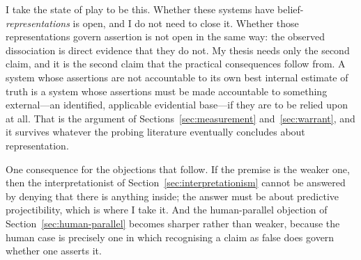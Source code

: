 I take the state of play to be this. Whether these systems have
belief-\emph{representations} is open, and I do not need to close it. Whether
those representations govern assertion is not open in the same way: the observed
dissociation is direct evidence that they do not. My thesis needs only the second
claim, and it is the second claim that the practical consequences follow from. A
system whose assertions are not accountable to its own best internal estimate of
truth is a system whose assertions must be made accountable to something
external---an identified, applicable evidential base---if they are to be relied
upon at all. That is the argument of
Sections~\ref{sec:measurement} and~\ref{sec:warrant}, and it survives whatever the
probing literature eventually concludes about representation.

One consequence for the objections that follow. If the premise is the weaker one,
then the interpretationist of Section~\ref{sec:interpretationism} cannot
be answered by denying that there is anything inside; the answer must be about
predictive projectibility, which is where I take it. And the human-parallel
objection of Section~\ref{sec:human-parallel} becomes sharper rather than
weaker, because the human case is precisely one in which recognising a claim as
false does govern whether one asserts it.
